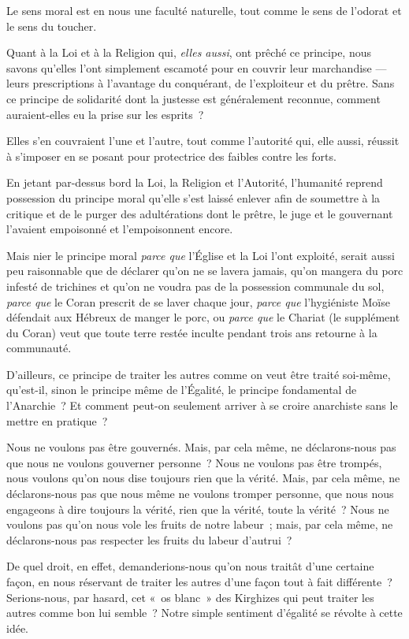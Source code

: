 \documentclass[french,twoside]{book} %
\begin{document}
Le sens moral est en nous une faculté naturelle, tout comme le sens de l’odorat et le sens du toucher.\par
\bigbreak
\noindent Quant à la Loi et à la Religion qui, \emph{elles aussi}, ont prêché ce principe, nous savons qu’elles l’ont simplement escamoté pour en couvrir leur marchandise — leurs prescriptions à l’avantage du conquérant, de l’exploiteur et du prêtre. Sans ce principe de solidarité dont la justesse est généralement reconnue, comment auraient-elles eu la prise sur les esprits ?\par
Elles s’en couvraient l’une et l’autre, tout comme l’autorité qui, elle aussi, réussit à s’imposer en se posant pour protectrice des faibles contre les forts.\par
En jetant par-dessus bord la Loi, la Religion et l’Autorité, l’humanité reprend possession du principe moral qu’elle s’est laissé enlever afin de soumettre à la critique et de le purger des adultérations dont le prêtre, le juge et le gouvernant l’avaient empoisonné et l’empoisonnent encore.\par
Mais nier le principe moral \emph{parce que} l’Église et la Loi l’ont exploité, serait aussi peu raisonnable que de déclarer qu’on ne se lavera jamais, qu’on mangera du porc infesté de trichines et qu’on ne voudra pas de la possession communale du sol, \emph{parce que} le Coran prescrit de se laver chaque jour, \emph{parce que} l’hygiéniste Moïse défendait aux Hébreux de manger le porc, ou \emph{parce que} le Chariat (le supplément du Coran) veut que toute terre restée inculte pendant trois ans retourne à la communauté.\par
\bigbreak
\noindent D’ailleurs, ce principe de traiter les autres comme on veut être traité soi-même, qu’est-il, sinon le principe même de l’Égalité, le principe  fondamental de l’Anarchie ? Et comment peut-on seulement arriver à se croire anarchiste sans le mettre en pratique ?\par
Nous ne voulons pas être gouvernés. Mais, par cela même, ne déclarons-nous pas que nous ne voulons gouverner personne ? Nous ne voulons pas être trompés, nous voulons qu’on nous dise toujours rien que la vérité. Mais, par cela même, ne déclarons-nous pas que nous même ne voulons tromper personne, que nous nous engageons à dire toujours la vérité, rien que la vérité, toute la vérité ? Nous ne voulons pas qu’on nous vole les fruits de notre labeur ; mais, par cela même, ne déclarons-nous pas respecter les fruits du labeur d’autrui ?\par
De quel droit, en effet, demanderions-nous qu’on nous traitât d’une certaine façon, en nous réservant de traiter les autres d’une façon tout à fait différente ? Serions-nous, par hasard, cet « os blanc » des Kirghizes qui peut traiter les autres comme bon lui semble ? Notre simple sentiment d’égalité se révolte à cette idée.\par
\end{document}
